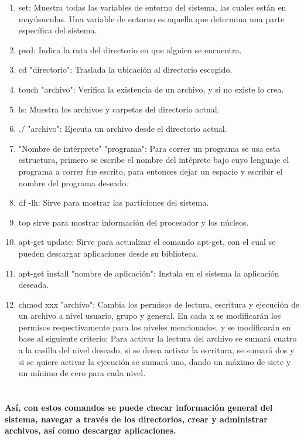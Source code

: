 \documentclass{book}
\begin{document}
	\begin{enumerate}
		\item set: Muestra todas las variables de entorno del sistema, las cuales están en mayúsuculas. Una variable de entorno es aquella que determina una parte específica del sistema.
		\item pwd: Indica la ruta del directorio en que alguien se encuentra.
		\item cd "directorio": Traslada la ubicación al directorio escogido.
		\item touch "archivo": Verifica la existencia de un archivo, y si no existe lo crea.
		\item ls: Muestra los archivos y carpetas del directorio actual.
		\item ./ "archivo": Ejecuta un archivo desde el directorio actual.
		\item "Nombre de intérprete" "programa": Para correr un programa se usa esta estructura, primero se escribe el nombre del intéprete bajo cuyo lenguaje el programa a correr fue escrito, para entonces dejar un espacio y escribir el nombre del programa deseado.
		\item df -lh: Sirve para mostrar las particiones del sistema.
		\item top sirve para mostrar información del procesador y los núcleos.
		\item apt-get update: Sirve para actualizar el comando apt-get, con el cual se pueden descargar aplicaciones desde su biblioteca.
		\item apt-get install "nombre de aplicación": Instala en el sistema la aplicación deseada.
		\item chmod xxx "archivo": Cambia los permisos de lectura, escritura y ejecución de un archivo a nivel usuario, grupo y general. En cada x se modificarán los permisos respectivamente para los niveles mencionados, y se modificarán en base al siguiente criterio: Para activar la lectura del archivo se sumará cuatro a la casilla del nivel deseado, si se desea activar la escritura, se sumará dos y si se quiere activar la ejecución se sumará uno, dando un máximo de siete y un mínimo de cero para cada nivel.
	\end{enumerate}
	\paragraph{\\Así, con estos comandos se puede checar información general del sistema, navegar a través de los directorios, crear y administrar archivos, así como descargar aplicaciones.}
\end{document}
